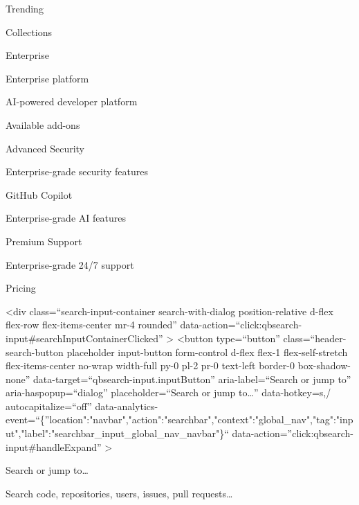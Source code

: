 \documentclass[
  letterpaper,
]{book}
\begin{document}
Trending

Collections

Enterprise

Enterprise platform

AI-powered developer platform

\label{enterprise-available-add-ons-heading}{Available
add-ons}

Advanced Security

Enterprise-grade security features

GitHub Copilot

Enterprise-grade AI features

Premium Support

Enterprise-grade 24/7 support

Pricing

\textless div class=``search-input-container search-with-dialog
position-relative d-flex flex-row flex-items-center mr-4 rounded''
data-action=``click:qbsearch-input\#searchInputContainerClicked''
\textgreater{} \textless button type=``button''
class=``header-search-button placeholder input-button form-control
d-flex flex-1 flex-self-stretch flex-items-center no-wrap width-full
py-0 pl-2 pr-0 text-left border-0 box-shadow-none''
data-target=``qbsearch-input.inputButton'' aria-label=``Search or jump
to'' aria-haspopup=``dialog'' placeholder=``Search or jump
to\ldots{}'' data-hotkey=s,/ autocapitalize=``off''
data-analytics-event=``\{''location":"navbar","action":"searchbar","context":"global\_nav","tag":"input","label":"searchbar\_input\_global\_nav\_navbar"\}``
data-action=''click:qbsearch-input\#handleExpand'' \textgreater{}

{Search or jump to\ldots{}}

Search code, repositories, users, issues, pull requests\ldots{}
\end{document}
